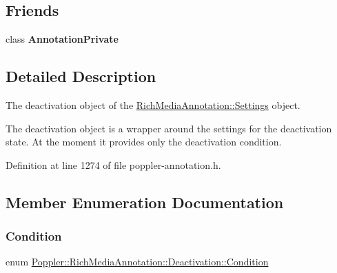 \subsection*{Friends}
\begin{DoxyCompactItemize}
\item 
\mbox{\label{class_poppler_1_1_rich_media_annotation_1_1_deactivation_add0bc3e32e560f9e9eb3025587c1ad54}} 
class {\bfseries Annotation\+Private}
\end{DoxyCompactItemize}


\subsection{Detailed Description}
The deactivation object of the \hyperlink{class_poppler_1_1_rich_media_annotation_1_1_settings}{Rich\+Media\+Annotation\+::\+Settings} object.

The deactivation object is a wrapper around the settings for the deactivation state. At the moment it provides only the deactivation condition. 

Definition at line 1274 of file poppler-\/annotation.\+h.



\subsection{Member Enumeration Documentation}
\mbox{\label{class_poppler_1_1_rich_media_annotation_1_1_deactivation_a54ffabfb7c1f3ad2ea052ba6689468d3}} 
\subsubsection{\texorpdfstring{Condition}{Condition}}
{\footnotesize\ttfamily enum \hyperlink{class_poppler_1_1_rich_media_annotation_1_1_deactivation_a54ffabfb7c1f3ad2ea052ba6689468d3}{Poppler\+::\+Rich\+Media\+Annotation\+::\+Deactivation\+::\+Condition}}

